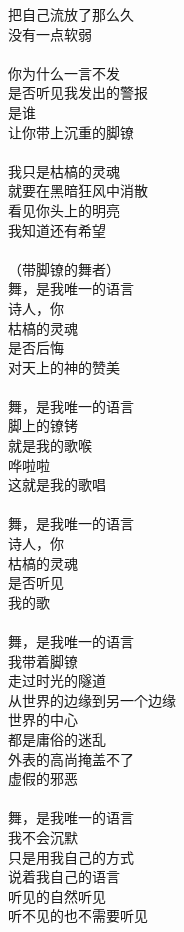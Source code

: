 把自己流放了那么久\\
没有一点软弱\\
\\
你为什么一言不发\\
是否听见我发出的警报\\
是谁\\
让你带上沉重的脚镣\\
\\
我只是枯槁的灵魂\\
就要在黑暗狂风中消散\\
看见你头上的明亮\\
我知道还有希望\\
\\
（带脚镣的舞者）\\
舞，是我唯一的语言\\
诗人，你\\
枯槁的灵魂\\
是否后悔\\
对天上的神的赞美\\
\\
舞，是我唯一的语言\\
脚上的镣铐\\
就是我的歌喉\\
哗啦啦\\
这就是我的歌唱\\
\\
舞，是我唯一的语言\\
诗人，你\\
枯槁的灵魂\\
是否听见\\
我的歌\\
\\
舞，是我唯一的语言\\
我带着脚镣\\
走过时光的隧道\\
从世界的边缘到另一个边缘\\
世界的中心\\
都是庸俗的迷乱\\
外表的高尚掩盖不了\\
虚假的邪恶\\
\\
舞，是我唯一的语言\\
我不会沉默\\
只是用我自己的方式\\
说着我自己的语言\\
听见的自然听见\\
听不见的也不需要听见\\
\\
